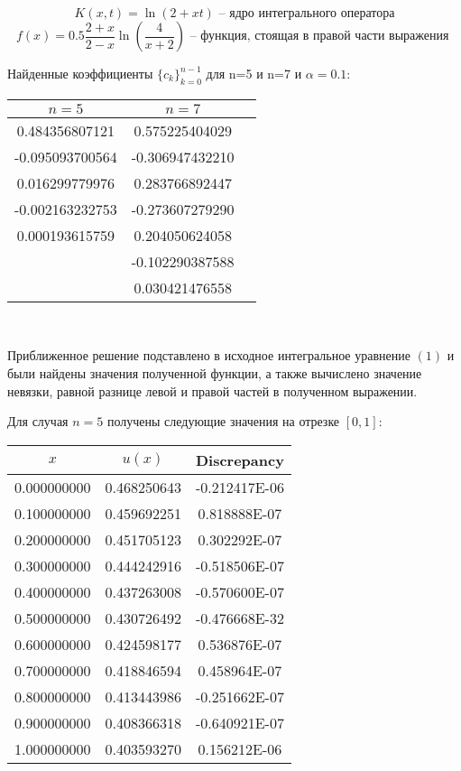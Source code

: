 \documentclass[12pt,a4paper]{article}
\begin{document}
$$ K(x,t) = \ln (2 + xt) \text{ \ \ -- \  ядро интегрального оператора} $$ 
$$ f(x) = 0.5\frac{2+x}{2-x} \ln \left ( \frac{4}{x+2} \right )
  \text{ \ \ -- \ функция, стоящая в правой части выражения } 
$$


Найденные коэффициенты $\{ c_k \}_{k=0}^{n-1}$ для n=5 и n=7 и $\alpha=0.1$:

\begin{center}
\begin{tabular}{ccc}
$n=5$ & $n=7$ \\
\hline

 0.484356807121 &  0.575225404029 \\
-0.095093700564 & -0.306947432210 \\
 0.016299779976 &  0.283766892447 \\
-0.002163232753 & -0.273607279290 \\
 0.000193615759 &  0.204050624058 \\
                & -0.102290387588 \\
                &  0.030421476558 \\
\end{tabular}
\end{center}


\

Приближенное решение подставлено в исходное интегральное уравнение $(1)$ и были найдены значения полученной функции, а также вычислено значение невязки, равной разнице левой и правой частей в полученном выражении.

Для случая $n=5$ получены следующие значения на отрезке $[0,1]$:

\begin{center} 
\begin{tabular}{|c|c|c|}
\hline
         $x$      &      $u(x)$    &  Discrepancy  \\
\hline
    0.000000000 & 0.468250643 & -0.212417E-06  \\
\hline
    0.100000000 & 0.459692251 &  0.818888E-07  \\
\hline
    0.200000000 & 0.451705123 &  0.302292E-07  \\
\hline
    0.300000000 & 0.444242916 & -0.518506E-07  \\
\hline
    0.400000000 & 0.437263008 & -0.570600E-07  \\
\hline
    0.500000000 & 0.430726492 & -0.476668E-32  \\
\hline
    0.600000000 & 0.424598177 &  0.536876E-07  \\
\hline
    0.700000000 & 0.418846594 &  0.458964E-07  \\
\hline
    0.800000000 & 0.413443986 & -0.251662E-07  \\
\hline
    0.900000000 & 0.408366318 & -0.640921E-07  \\
\hline
    1.000000000 & 0.403593270 &  0.156212E-06  \\
\hline

\end{tabular}
\end{center}
\end{document}
